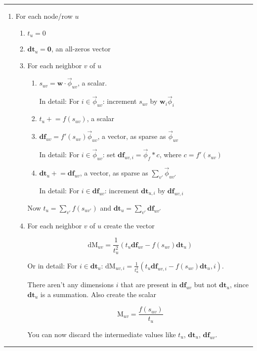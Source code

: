 \documentclass[12pt]{article}
\newcommand{\vek}[1]{\textbf{#1}}
\newcommand{\M}{\textrm{M}}
\newcommand{\dM}{\textrm{dM}}
\newcommand{\df}{\textbf{df}}
\newcommand{\dt}{\textbf{dt}}
\newcommand{\vphi}{\vec{\phi}}
\begin{document}
\begin{table}
\hrule
\begin{enumerate}
\item For each node/row $u$
  \begin{enumerate}
  \item  $t_u = 0$
  \item  $\dt_u = \vek{0}$, an all-zeros vector
  \item For each neighbor $v$ of $u$
    \begin{enumerate}    
    \item $s_{uv} = \vek{w} \cdot \vphi_{uv}$,  a scalar.

      In detail: For $i\in \vphi_{uv}$: increment $s_{uv}$ by $\vek{w}_i\vphi_i$

    \item $t_u  +\!\!= f(s_{uv})$, a scalar
    \item $\df_{uv} = f'(s_{uv}) \vphi_{uv}$, a vector, as sparse as $\vphi_{uv}$

      In detail: For $i\in \vphi_{uv}$: set $\df_{uv,i} = \vphi_f * c$, where $c=f'(s_{uv})$

    \item  $\dt_u +\!\!= \df_{uv}$, a vector, as sparse as $\sum_{v'} \vphi_{uv'}$

      In detail: For $i\in \df_{uv}$: increment $\dt_{u,i}$ by $\df_{uv,i}$

    \end{enumerate}
  Now $t_u = \sum_{v'} f(s_{uv'})$ and $\dt_{u} = \sum_{v'} \df_{uv'}$
  \item For each neighbor $v$ of $u$ create the vector

\[ \dM_{uv}  = \frac{1}{t_u ^2} \left( t_u \df_{uv} - f(s_{uv}) \dt_u \right)  
\]

Or in detail: For $i\in\dt_u$: $\dM_{uv,i} = \frac{1}{t_u ^2} \left( t_u \df_{uv,i} - f(s_{uv}) \dt_u,i \right)$.  

There aren't any dimensions $i$ that are present in $\df_{uv}$ but not
$\dt_u$, since $\dt_u$ is a summation.  Also create the scalar

\[ \M_{uv}  = \frac{f(s_{uv})}{t_u} 
\]

  You can now discard the intermediate values like $t_u$, $\dt_u$, $\df_{uv}$.

  \end{enumerate}
\end{enumerate}
\caption{Computing $\M$ and $\dM$} \label{alg:mat}
\hrule
\end{table}
\end{document}

